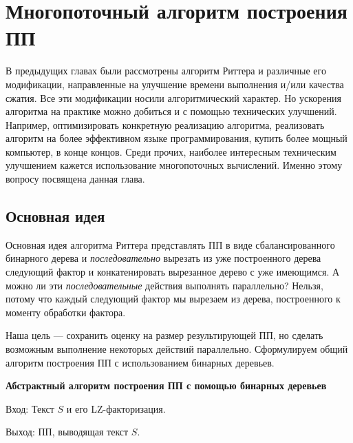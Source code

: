 \documentclass[14pt]{article}
\begin{document}
\section{Многопоточный алгоритм построения ПП}
\label{ConcurrentAvlSLP}

В предыдущих главах были рассмотрены алгоритм Риттера и различные его модификации, направленные на улучшение времени выполнения
и/или качества сжатия. Все эти модификации носили алгоритмический характер. Но ускорения алгоритма на практике можно добиться
и с помощью технических улучшений. Например, оптимизировать конкретную реализацию алгоритма, реализовать алгоритм на более
эффективном языке программирования, купить более мощный компьютер, в конце концов. Среди прочих, наиболее интересным
техническим улучшением кажется использование многопоточных вычислений. Именно этому вопросу посвящена данная глава.

\subsection{Основная идея}

Основная идея алгоритма Риттера представлять ПП в виде сбалансированного бинарного дерева и {\it последовательно}
вырезать из уже построенного дерева следующий фактор и конкатенировать вырезанное дерево с уже имеющимся.
А можно ли эти {\it последовательные} действия выполнять параллельно? Нельзя, потому что каждый следующий фактор
мы вырезаем из дерева, построенного к моменту обработки фактора.

Наша цель --- сохранить оценку на размер результирующей ПП, но сделать возможным выполнение некоторых действий
параллельно. Сформулируем общий алгоритм построения ПП с использованием бинарных деревьев.

{\bf Абстрактный алгоритм построения ПП с помощью бинарных деревьев}

{\sc Вход:} Текст $S$ и его LZ-факторизация.

{\sc Выход:} ПП, выводящая текст $S$.
\end{document}
